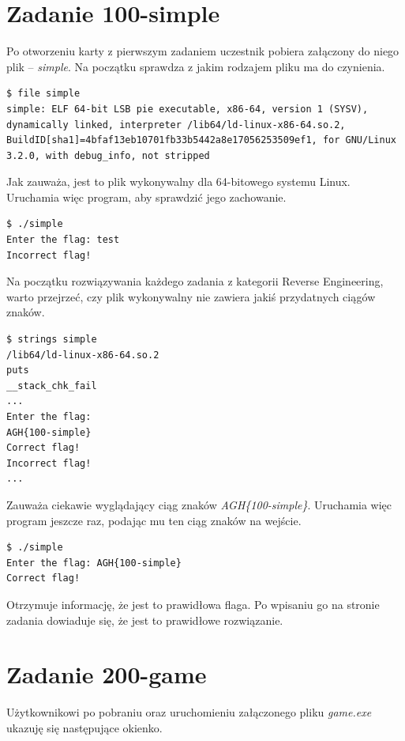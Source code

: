 \documentclass[language=polish,type=eng]{aghmodern}
\begin{document}
\begin{appendices}
\section{Zadanie 100-simple}

Po otworzeniu karty z pierwszym zadaniem uczestnik pobiera załączony do niego
plik -- \emph{simple}.
Na początku sprawdza z jakim rodzajem pliku ma do czynienia.

\begin{verbatim}
$ file simple
simple: ELF 64-bit LSB pie executable, x86-64, version 1 (SYSV), dynamically linked, interpreter /lib64/ld-linux-x86-64.so.2, BuildID[sha1]=4bfaf13eb10701fb33b5442a8e17056253509ef1, for GNU/Linux 3.2.0, with debug_info, not stripped
\end{verbatim}

Jak zauważa, jest to plik wykonywalny dla 64-bitowego systemu Linux.
Uruchamia więc program, aby sprawdzić jego zachowanie.

\begin{verbatim}
$ ./simple
Enter the flag: test
Incorrect flag!
\end{verbatim}

Na początku rozwiązywania każdego zadania z kategorii Reverse Engineering, warto
przejrzeć, czy plik wykonywalny nie zawiera jakiś przydatnych ciągów znaków.

\begin{verbatim}
$ strings simple
/lib64/ld-linux-x86-64.so.2
puts
__stack_chk_fail
...
Enter the flag: 
AGH{100-simple}
Correct flag!
Incorrect flag!
...
\end{verbatim}

Zauważa ciekawie wyglądający ciąg znaków \emph{AGH\{100-simple\}}.
Uruchamia więc program jeszcze raz, podając mu ten ciąg znaków na wejście.

\begin{verbatim}
$ ./simple
Enter the flag: AGH{100-simple}
Correct flag!
\end{verbatim}

Otrzymuje informację, że jest to prawidłowa flaga.
Po wpisaniu go na stronie zadania dowiaduje się, że jest to prawidłowe rozwiązanie.

\section{Zadanie 200-game}

Użytkownikowi po pobraniu oraz uruchomieniu załączonego pliku \emph{game.exe} ukazuję
się następujące okienko.


\end{appendices}
\end{document}
